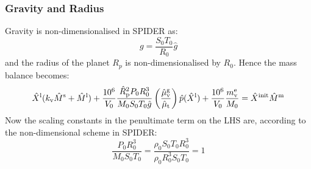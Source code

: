 \subsubsection{Gravity and Radius}
Gravity is non-dimensionalised in SPIDER as:
\begin{equation}
g = \frac{S_0 T_0}{R_0} \hat{g}
\end{equation}
and the radius of the planet $R_p$ is non-dimensionalised by $R_0$.  Hence the mass balance becomes:
\begin{equation}
\hat{X}^{\rm l} (k_{\rm v} \hat{M}^{\rm s} + \hat{M}^{\rm l}) + \frac{10^6}{V_0}\frac{\hat{R}_{\rm p}^2 P_0 R_0^3}{M_0 S_0 T_0 \hat{g}} \left( \frac{\hat{\mu}_{\rm v}^{\rm g}}{\hat{\mu}_{\rm t}} \right) \hat{p} (\hat{X}^{\rm l}) + \frac{10^6}{V_0} \frac{m_{\rm v}^{\rm e}}{M_0} = \hat{X}^{\rm init} \hat{M}^{\rm m}
\end{equation}
Now the scaling constants in the penultimate term on the LHS are, according to the non-dimensional scheme in SPIDER:
\begin{equation}
\frac{P_0 R_0^3}{M_0 S_0 T_0} = \frac{\rho_0 S_0 T_0 R_0^3}{\rho_0 R_0^3 S_0 T_0} = 1
\end{equation}
